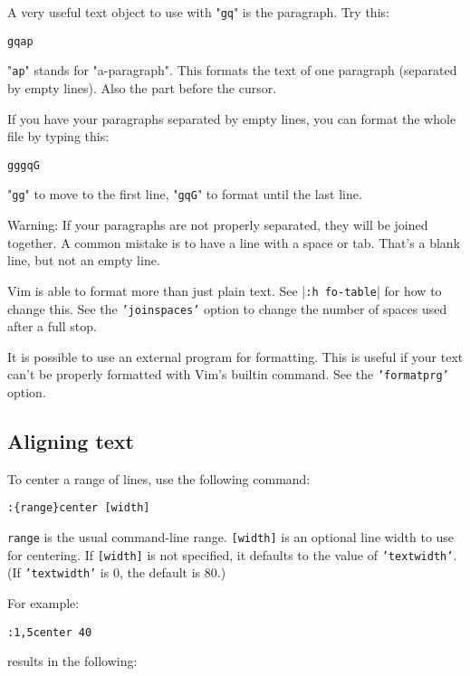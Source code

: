 A very useful text object to use with "\texttt{gq}" is the paragraph.
Try this:

\begin{Verbatim}[samepage=true]
 gqap
\end{Verbatim}

"\texttt{ap}" stands for "a-paragraph".
This formats the text of one paragraph (separated by empty lines).
Also the part before the cursor.

If you have your paragraphs separated by empty lines, you can format the whole file by typing this:

\begin{Verbatim}[samepage=true]
 gggqG
\end{Verbatim}

"\texttt{gg}" to move to the first line, "\texttt{gqG}" to format until the last line.

Warning: If your paragraphs are not properly separated, they will be joined together.
A common mistake is to have a line with a space or tab.
That's a blank line, but not an empty line.

Vim is able to format more than just plain text.
See |\texttt{:h fo-table}| for how to change this.
See the \texttt{'joinspaces'} option to change the number of spaces used after a full stop.

It is possible to use an external program for formatting.
This is useful if your text can't be properly formatted with Vim's builtin command.
See the \texttt{'formatprg'} option.
\subsection{Aligning text}
To center a range of lines, use the following command:

\begin{Verbatim}[samepage=true]
 :{range}center [width]
\end{Verbatim}

\texttt{{range}} is the usual command-line range.
\texttt{[width]} is an optional line width to use for centering.
If \texttt{[width]} is not specified, it defaults to the value of \texttt{'textwidth'}.
(If \texttt{'textwidth'} is 0, the default is 80.)

For example:

\begin{Verbatim}[samepage=true]
 :1,5center 40
\end{Verbatim}

results in the following:

